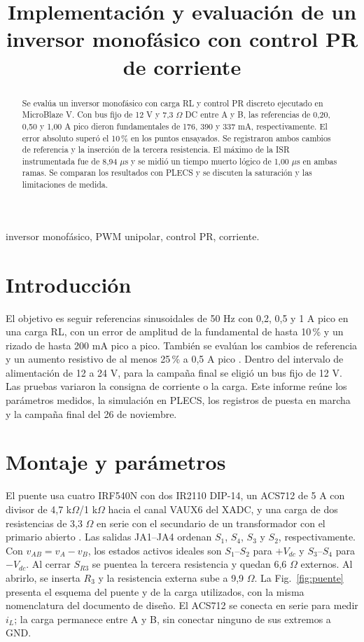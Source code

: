 \documentclass[conference]{IEEEtran}
\begin{document}
\title{Implementación y evaluación de un inversor monofásico con control PR de corriente}
\autores\maketitle
\begin{abstract}
Se evalúa un inversor monofásico con carga RL y control PR discreto ejecutado en MicroBlaze V. Con bus fijo de 12 V y 7,3 $\Omega$ DC entre A y B, las referencias de 0,20, 0,50 y 1,00 A pico dieron fundamentales de 176, 390 y 337 mA, respectivamente. El error absoluto superó el 10\,\% en los puntos ensayados. Se registraron ambos cambios de referencia y la inserción de la tercera resistencia. El máximo de la ISR instrumentada fue de 8,94 $\mu$s y se midió un tiempo muerto lógico de 1,00 $\mu$s en ambas ramas. Se comparan los resultados con PLECS y se discuten la saturación y las limitaciones de medida.
\end{abstract}
\begin{IEEEkeywords}inversor monofásico, PWM unipolar, control PR, corriente.\end{IEEEkeywords}

\section{Introducción}
El objetivo es seguir referencias sinusoidales de 50 Hz con 0,2, 0,5 y 1 A pico en una carga RL, con un error de amplitud de la fundamental de hasta 10\,\% y un rizado de hasta 200 mA pico a pico. También se evalúan los cambios de referencia y un aumento resistivo de al menos 25\,\% a 0,5 A pico \cite{enunciado}. Dentro del intervalo de alimentación de 12 a 24 V, para la campaña final se eligió un bus fijo de 12 V. Las pruebas variaron la consigna de corriente o la carga. Este informe reúne los parámetros medidos, la simulación en PLECS, los registros de puesta en marcha y la campaña final del 26 de noviembre.

\section{Montaje y parámetros}
El puente usa cuatro IRF540N con dos IR2110 DIP-14, un ACS712 de 5 A con divisor de 4,7 k$\Omega$/1 k$\Omega$ hacia el canal VAUX6 del XADC, y una carga de dos resistencias de 3,3 $\Omega$ en serie con el secundario de un transformador con el primario abierto \cite{irf,ir,acs,xadc}. Las salidas JA1--JA4 ordenan $S_1$, $S_4$, $S_3$ y $S_2$, respectivamente. Con $v_{AB}=v_A-v_B$, los estados activos ideales son $S_1$--$S_2$ para $+V_{dc}$ y $S_3$--$S_4$ para $-V_{dc}$. Al cerrar $S_{R3}$ se puentea la tercera resistencia y quedan 6,6 $\Omega$ externos. Al abrirlo, se inserta $R_3$ y la resistencia externa sube a 9,9 $\Omega$. La Fig.~\ref{fig:puente} presenta el esquema del puente y de la carga utilizados, con la misma nomenclatura del documento de diseño. El ACS712 se conecta en serie para medir $i_L$; la carga permanece entre A y B, sin conectar ninguno de sus extremos a GND.
\end{document}
